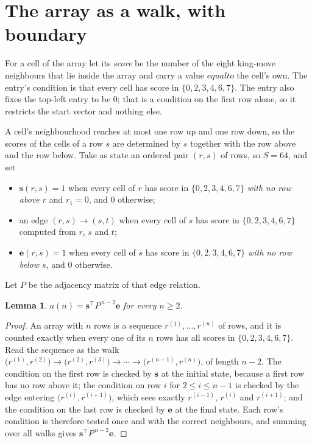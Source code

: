 \documentclass[11pt,a4paper]{article}
\theoremstyle{plain}
\newtheorem{lemma}[theorem]{Lemma}
\theoremstyle{definition}
\begin{document}
\section{The array as a walk, with boundary}

For a cell of the array let its \emph{score} be the number of the eight king-move neighbours that lie inside
the array and carry a value $equal to$ the cell's own. The entry's condition is that every cell
has score in $\{0,2,3,4,6,7\}$. The entry also fixes the top-left entry to be $0$; that is a condition on the first row alone, so it restricts the start vector and nothing else.

A cell's neighbourhood reaches at most one row up and one row down, so the scores of the
cells of a row $s$ are determined by $s$ together with the row above and the row below.
Take as state an ordered pair $(r,s)$ of rows, so $S=64$, and set
\begin{itemize}
\item $\mathbf{s}(r,s)=1$ when every cell of $r$ has score in $\{0,2,3,4,6,7\}$ \emph{with no row
above $r$} and $r_1=0$, and $0$ otherwise;
\item an edge $(r,s)\to(s,t)$ when every cell of $s$ has score in $\{0,2,3,4,6,7\}$ computed from
$r$, $s$ and $t$;
\item $\mathbf{e}(r,s)=1$ when every cell of $s$ has score in $\{0,2,3,4,6,7\}$ \emph{with no row
below $s$}, and $0$ otherwise.
\end{itemize}
Let $P$ be the adjacency matrix of that edge relation.

\begin{lemma}\label{lem:walk}
$a(n)=\mathbf{s}^{\!\top}P^{\,n-2}\mathbf{e}$ for every $n\ge2$.
\end{lemma}

\begin{proof}
An array with $n$ rows is a sequence $r^{(1)},\dots,r^{(n)}$ of rows, and it is counted
exactly when every one of its $n$ rows has all scores in $\{0,2,3,4,6,7\}$. Read the sequence as the
walk $\bigl(r^{(1)},r^{(2)}\bigr)\to\bigl(r^{(2)},r^{(3)}\bigr)\to\cdots\to
\bigl(r^{(n-1)},r^{(n)}\bigr)$, of length $n-2$. The condition on the first row is
checked by $\mathbf{s}$ at the initial state, because a first row has no row above it; the
condition on row $i$ for $2\le i\le n-1$ is checked by the edge entering
$\bigl(r^{(i)},r^{(i+1)}\bigr)$, which sees exactly $r^{(i-1)}$, $r^{(i)}$ and
$r^{(i+1)}$; and the condition on the last row is checked by $\mathbf{e}$ at the final
state. Each row's condition is therefore tested once and with the correct neighbours, and
summing over all walks gives $\mathbf{s}^{\!\top}P^{\,n-2}\mathbf{e}$.
\end{proof}
\end{document}
